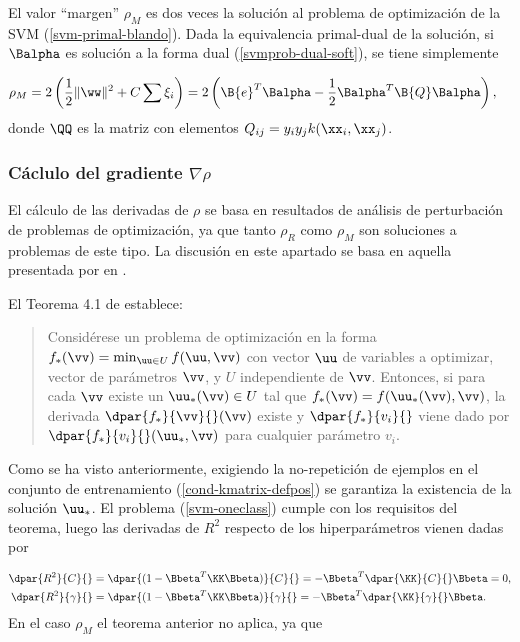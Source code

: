 El valor ``margen'' $\rho_M$ es dos veces la solución al problema de
optimización de la SVM (\autoref{svm-primal-blando}).  Dada la
equivalencia primal-dual de la solución, si $\Balpha$ es solución a
la forma dual (\autoref{svmprob-dual-soft}), se tiene simplemente

\begin{align}
\label{prieqdual}
  \rho_M &= 2\left(\frac{1}{2}\|\ww\|^2+C\sum\xi_i \right)
  =2\left(\B{e}^T\Balpha-\frac{1}{2}\Balpha^T\B{Q}\Balpha\right),
\end{align}
donde $\QQ$ es la matriz con elementos $Q_{ij}=y_iy_jk(\xx_i,\xx_j)$.

\subsubsection{Cáclulo del gradiente $\nabla\rho$}
El cálculo de las derivadas de $\rho$ se basa en resultados de
análisis de perturbación de problemas de optimización, ya que tanto
$\rho_R$ como $\rho_M$ son soluciones a problemas de este tipo.  La
discusión en este apartado se basa en aquella presentada por
\citeauthor{chung} en \cite{chung}.

El Teorema 4.1 de \cite{bonnans-shapiro} establece:

\begin{quote}
  Considérese un problema de optimización en la forma
  $f_*(\vv)=\min_{\uu\in{}U}f(\uu,\vv)$ con vector $\uu$ de variables a
  optimizar, vector de parámetros $\vv$, y $U$ independiente de
  $\vv$. Entonces, si para cada $\vv$ existe un $\uu_*(\vv)\in{}U$
  tal que $f_*(\vv)=f(\uu_*(\vv),\vv)$, la derivada
  $\dpar{f_*}{\vv}{}(\vv)$ existe y $\dpar{f_*}{v_i}{}$ viene dado por
  $\dpar{f_*}{v_i}{}(\uu_*,\vv)$ para cualquier parámetro $v_i$.
\end{quote}

Como se ha visto anteriormente, exigiendo la no-repetición de ejemplos
en el conjunto de entrenamiento (\ref{cond-kmatrix-defpos}) se
garantiza la existencia de la solución $\uu_*$.
El problema (\ref{svm-oneclass}) cumple con los requisitos del teorema,
luego las derivadas de $R^2$ respecto de los hiperparámetros vienen
dadas por

\begin{align}
  \dpar{R^2}{C}{} &= \dpar{(1-\Bbeta^T\KK\Bbeta)}{C}{}
  = -\Bbeta^T \dpar{\KK}{C}{}\Bbeta = 0, \\
  \dpar{R^2}{\gamma}{} &= \dpar{(1-\Bbeta^T\KK\Bbeta)}{\gamma}{}
  = -\Bbeta^T \dpar{\KK}{\gamma}{}\Bbeta.
\end{align}
En el caso $\rho_M$ el teorema anterior no aplica, ya que

